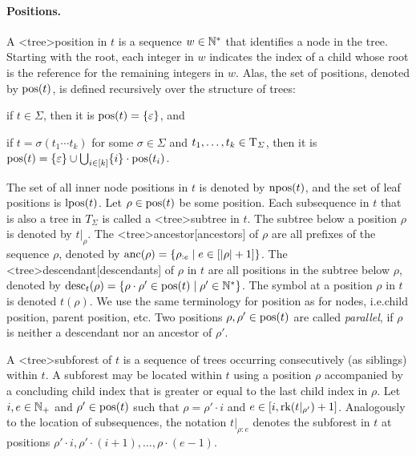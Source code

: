 \documentclass[../document.tex]{subfiles}
\begin{document}
    \paragraph{Positions.}
    A <tree>{position} in \(t\) is a sequence $w \in \mathbb{N}^*$ that identifies a node in the tree.
    Starting with the root, each integer in \(w\) indicates the index of a child whose root is the reference for the remaining integers in \(w\).
    Alas, the set of positions, denoted by \(\operatorname{pos}(t)\), is defined recursively over the structure of trees:
    \begin{inparaenum}
        \item if \(t \in \varSigma\), then it is \(\operatorname{pos}(t) = \{\varepsilon\}\), and
        \item if \(t = \sigma(t_1 \cdots t_k)\) for some \(\sigma\in \varSigma\) and \(t_1, \ldots, t_k \in \operatorname{T}_\varSigma\), then it is \(\operatorname{pos}(t) = \{\varepsilon\} \cup \bigcup_{i\in[k]} \{i\}\cdot \operatorname{pos}(t_i)\).
    \end{inparaenum}
    The set of all inner node positions in \(t\) is denoted by \(\operatorname{npos}(t)\), and the set of leaf positions is \(\operatorname{lpos}(t)\).
    Let \(\rho \in \operatorname{pos}(t)\) be some position.
    Each subsequence in \(t\) that is also a tree in \(T_\varSigma\) is called a <tree>{subtree} in \(t\).
    The subtree below a position \(\rho\) is denoted by \(t|_\rho\).
    The <tree>{ancestor}[ancestors] of \(\rho\) are all prefixes of the sequence \(\rho\), denoted by \(\operatorname{anc}(\rho) = \{ \rho_{:e} \mid e \in [|\rho|+1] \}\).
    The <tree>{descendant}[descendants] of \(\rho\) in \(t\) are all positions in the subtree below \(\rho\), denoted by \(\operatorname{desc}_t(\rho) = \{ \rho \cdot \rho' \in \operatorname{pos}(t) \mid \rho' \in \mathbb{N}^* \}\).
    The symbol at a position \(\rho\) in \(t\) is denoted  \(t(\rho)\).
    We use the same terminology for position as for nodes, i.e.\@ child position, parent position, etc.
    Two positions \(\rho, \rho' \in \operatorname{pos}(t)\) are called \emph{parallel}, if \(\rho\) is neither a descendant nor an ancestor of \(\rho'\).

    A <tree>{subforest} of \(t\) is a sequence of trees occurring consecutively (as siblings) within \(t\).
    A subforest may be located within \(t\) using a position \(\rho\) accompanied by a concluding child index that is greater or equal to the last child index in \(\rho\).
    Let \(i, e \in \mathbb{N}_+\) and \(\rho' \in \operatorname{pos}(t)\) such that \(\rho = \rho' \cdot i\) and \(e \in [i,\operatorname{rk}(t|_{\rho'})+1]\).
    Analogously to the location of subsequences, the notation \(t|_{\rho:e}\) denotes the subforest in \(t\) at positions \(\rho' \cdot i, \rho' \cdot (i+1), \ldots, \rho \cdot (e-1)\).
\end{document}
